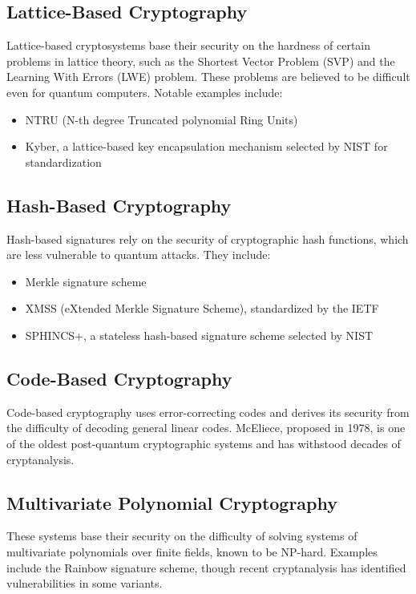 \subsection{Lattice-Based Cryptography}
Lattice-based cryptosystems base their security on the hardness of certain problems in lattice theory, such as the Shortest Vector Problem (SVP) and the Learning With Errors (LWE) problem. These problems are believed to be difficult even for quantum computers. Notable examples include:
\begin{itemize}
    \item NTRU (N-th degree Truncated polynomial Ring Units)
    \item Kyber, a lattice-based key encapsulation mechanism selected by NIST for standardization
\end{itemize}

\subsection{Hash-Based Cryptography}
Hash-based signatures rely on the security of cryptographic hash functions, which are less vulnerable to quantum attacks. They include:
\begin{itemize}
    \item Merkle signature scheme
    \item XMSS (eXtended Merkle Signature Scheme), standardized by the IETF
    \item SPHINCS+, a stateless hash-based signature scheme selected by NIST
\end{itemize}

\subsection{Code-Based Cryptography}
Code-based cryptography uses error-correcting codes and derives its security from the difficulty of decoding general linear codes. McEliece, proposed in 1978, is one of the oldest post-quantum cryptographic systems and has withstood decades of cryptanalysis.

\subsection{Multivariate Polynomial Cryptography}
These systems base their security on the difficulty of solving systems of multivariate polynomials over finite fields, known to be NP-hard. Examples include the Rainbow signature scheme, though recent cryptanalysis has identified vulnerabilities in some variants.

